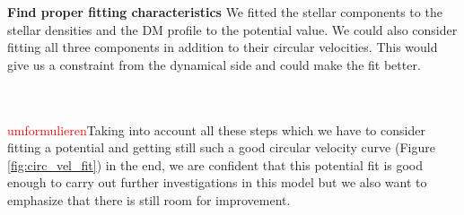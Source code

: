 \textbf{Find proper fitting characteristics}
We fitted the stellar components to the stellar densities and the \ac{DM} profile to the potential value. We could also consider fitting all three components in addition to their circular velocities. This would give us a constraint from the dynamical side and could make the fit better.

\\\\ \textcolor{red}{umformulieren}Taking into account all these steps which we have to consider fitting a potential and getting still such a good circular velocity curve (Figure \ref{fig:circ_vel_fit}) in the end, we are confident that this potential fit is good enough to carry out further investigations in this model but we also want to emphasize that there is still room for improvement.


